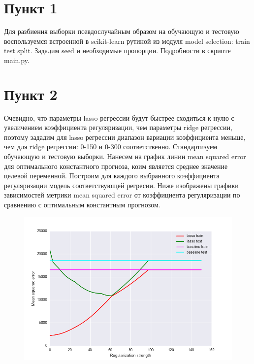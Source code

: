 \documentclass[a4paper, 12pt, oneside]{scrartcl}
\numberwithin{equation}{section}
\numberwithin{table}{section}
\numberwithin{figure}{section}
\begin{document}
\section{Пункт 1}
Для разбиения выборки псевдослучайным образом на обучающую и тестовую воспользуемся встроенной в scikit-learn рутиной из модуля model selection: 
train test split. Зададим seed и необходимые пропорции. Подробности в скрипте main.py.

\section{Пункт 2}
Очевидно, что параметры lasso регрессии будут быстрее сходиться к нулю с увеличением коэффициента регуляризации, чем параметры ridge регрессии, 
поэтому зададим для lasso регрессии диапазон вариации коэффициента меньше, чем для ridge регрессии: 0-150 и 0-300 соответственно. Стандартизуем 
обучающую и тестовую выборки. Нанесем на график линии mean squared error для оптимального константного прогноза, коим является среднее значение 
целевой переменной. Построим 
для каждого выбранного коэффициента регуляризации модель соответствующей регресии. Ниже изображены графики зависимостей метрики mean squared error 
от коэффициента регуляризации по сравнению с оптимальным константным прогнозом.
\begin{figure}[h]
    \centering
    \includegraphics[width=\linewidth]{rss_lasso.png}
\end{figure}
\newline
\end{document}
